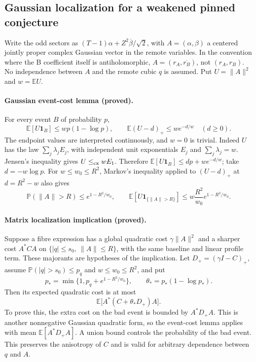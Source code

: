 \subsection{Gaussian localization for a weakened pinned conjecture}
Write the odd sectors as $(T-1)\alpha+Z^2\overline\beta/\sqrt2$, with
$A=(\alpha,\beta)$ a centered jointly proper complex Gaussian vector in the
remote variables. In the convention where the B coefficient itself is
antiholomorphic, $A=(r_A,\overline{r_B})$, not $(r_A,r_B)$.
No independence between $A$ and the remote cubic $q$ is assumed.
Put $U=\|A\|^2$ and $w=\mathbb EU$.

\paragraph{Gaussian event-cost lemma (proved).}
For every event $B$ of probability $p$,
\[
 \mathbb E[U\mathbf1_B]\le wp(1-\log p),
 \qquad \mathbb E(U-d)_+\le we^{-d/w}\quad(d\ge0).
\]
The endpoint values are interpreted continuously, and $w=0$ is trivial.
Indeed $U$ has the law $\sum_j\lambda_jE_j$, with independent unit
exponentials $E_j$ and $\sum_j\lambda_j=w$. Jensen's inequality gives
$U\le_{\rm cx}wE_1$. Therefore
$\mathbb E[U\mathbf1_B]\le dp+we^{-d/w}$; take $d=-w\log p$.
For $w\le w_0\le R^2$, Markov's inequality applied to $(U-d)_+$ at
$d=R^2-w$ also gives
\[
 \mathbb P(\|A\|>R)\le e^{1-R^2/w_0},\qquad
 \mathbb E[U\mathbf1_{\{\|A\|>R\}}]
 \le w\frac{R^2}{w_0}e^{1-R^2/w_0}.
\]

\paragraph{Matrix localization implication (proved).}
Suppose a fibre expression has a global quadratic cost
$\gamma\|A\|^2$ and a sharper cost $A^*CA$ on
$\{|q|\le s_0,\ \|A\|\le R\}$, with the same baseline and linear
profile term. These majorants are hypotheses of the implication.
Let $D_+=(\gamma I-C)_+$, assume
$\mathbb P(|q|>s_0)\le p_q$ and $w\le w_0\le R^2$, and put
\[
 p_* =\min\{1,p_q+e^{1-R^2/w_0}\},\qquad
 \theta_*=p_*(1-\log p_*).
\]
Then its expected quadratic cost is at most
\[
 \mathbb E\bigl[A^*(C+\theta_*D_+)A\bigr].
\]
To prove this, the extra cost on the bad event is bounded by
$A^*D_+A$. This is another nonnegative Gaussian quadratic form, so the
event-cost lemma applies with mean $\mathbb E[A^*D_+A]$. A union bound
controls the probability of the bad event. This preserves the anisotropy
of $C$ and is valid for arbitrary dependence between $q$ and $A$.

